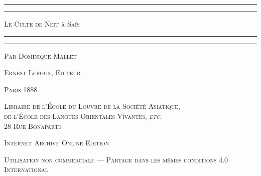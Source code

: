 \documentclass[a4paper, 11pt, oneside]{article}
\begin{document}
\renewcommand{\thefigure}{\bfseries{\arabic{figure}}}

\renewcommand\thefootnote{{\bfseries\color{Black}{\arabic{footnote}}}}
\let\oldfootnote\footnote
    \renewcommand{\footnote}[1]{\oldfootnote{{\normalsize\bfseries\color{Black}#1}}}

\begin{titlepage} %
	\centering %

	
	\rule{\textwidth}{1.6pt}\vspace*{-\baselineskip}\vspace*{2pt} %
	\rule{\textwidth}{0.4pt} %
	
	\vspace{1\baselineskip} %
	
	{\scshape\Huge Le Culte de Neit à Saïs}
	
	\vspace{1\baselineskip} %

	\rule{\textwidth}{0.4pt}\vspace*{-\baselineskip}\vspace{3.2pt} %
	\rule{\textwidth}{1.6pt} %
	
	\vspace{1\baselineskip} %
	
	
	{\scshape \Large Par Dominique Mallet} %
	
	\vspace*{1\baselineskip} %
	
        {\scshape\scriptsize Ernest Leroux, Editeur} %
    
        \vspace*{\fill}

	\vspace{1\baselineskip}

	{\small\scshape Paris 1888}
	
	{\small\scshape{Libraire de l'École du Louvre de la Société Asiatique,\\ de l'École des Langues Orientales Vivantes, \emph{etc.} \\ 28 Rue Bonaparte}}
	
	\vspace{0.5\baselineskip} %

        \scshape Internet Archive Online Edition  %
	
	{\scshape\small Utilisation non commerciale --- Partage dans les mêmes conditions 4.0 International} %
\end{titlepage}
\end{document}
